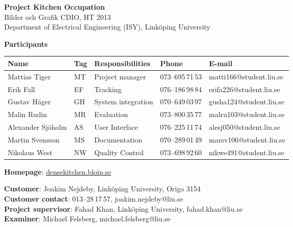 \begin{center}
    \vspace*{4\baselineskip}

	\textbf{\huge Project Kitchen Occupation} \\
	\vspace*{0.5\baselineskip}
	Bilder och Grafik CDIO, HT 2013 \\
	Department of Electrical Engineering (ISY), Link\"{o}ping University
	
	\vspace*{2\baselineskip}
	\textbf{\LARGE Participants}


	{\footnotesize 
	\begin{tabular}{|p{2.7cm}|p{1cm}|p{5cm}|p{2cm}|p{3.4cm}|}
			\hline
			\textbf{Name} & \textbf{Tag} & \textbf{Responsibilities} & \textbf{Phone} & \textbf{E-mail} \\
			\hline
			Mattias Tiger & MT & Project manager & 073--695\,71\,53 & matti166@student.liu.se \\
			\hline
			Erik Fall & EF & Tracking & 076--186\,98\,84 & erifa226@student.liu.se \\
			\hline
			Gustav Häger & GH & System integration & 070--649\,03\,97 & gusha124@student.liu.se \\
			\hline
			Malin Rudin & MR & Evaluation & 073--800\,35\,77 & malru103@student.liu.se \\
			\hline
			Alexander Sjöholm & AS & User Interface & 076--225\,11\,74 & alesj050@student.liu.se \\
			\hline
			Martin Svensson & MS & Documentation & 070--289\,01\,49 & marsv106@student.liu.se \\
			\hline
			Nikolaus West & NW & Quality Control & 073--698\,92\,60 & nikwe491@student.liu.se \\
			\hline
	\end{tabular}
	}

{\footnotesize 
\vspace{0.5\baselineskip}
\textbf{Homepage}: \href{http://densekitchen.bloip.se/}{densekitchen.bloip.se} \\
\vspace{1\baselineskip}

\textbf{Customer}: Joakim Nejdeby, Link\"{o}ping University, Origo 3154 \\
\textbf{Customer contact}: 013--28\,17\,57, joakim.nejdeby@liu.se \\
\textbf{Project supervisor}: Fahad Khan, Link\"{o}ping University, fahad.khan@liu.se \\
\textbf{Examiner}: Michael Felsberg, michael.felsberg@liu.se \\
}

\end{center}
